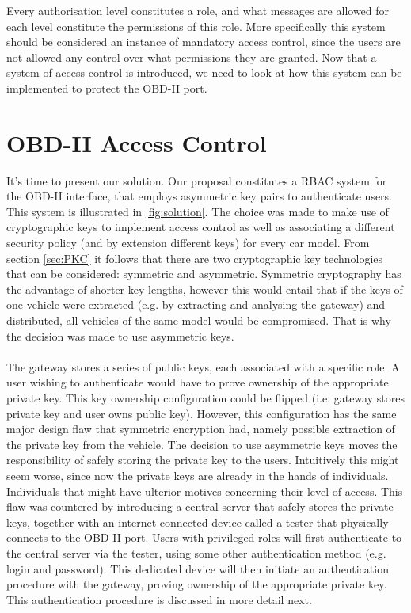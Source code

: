 Every authorisation level constitutes a role, and what messages are allowed for each level constitute the permissions of this role. More specifically this system should be considered an instance of mandatory access control, since the users are not allowed any control over what permissions they are granted. Now that a system of access control is introduced, we need to look at how this system can be implemented to protect the OBD-II port.

\section{OBD-II Access Control}
\label{sec:obd2_access_control}

It's time to present our solution. Our proposal constitutes a RBAC system for the OBD-II interface, that employs asymmetric key pairs to authenticate users. This system is illustrated in \ref{fig:solution}. The choice was made to make use of cryptographic keys to implement access control as well as associating a different security policy (and by extension different keys) for every car model. From section \ref{sec:PKC} it follows that there are two cryptographic key technologies that can be considered: symmetric and asymmetric. Symmetric cryptography has the advantage of shorter key lengths, however this would entail that if the keys of one vehicle were extracted (e.g. by extracting and analysing the gateway) and distributed, all vehicles of the same model would be compromised. That is why the decision was made to use asymmetric keys. \\ \\ The gateway stores a series of public keys, each associated with a specific role. A user wishing to authenticate would have to prove ownership of the appropriate private key. This key ownership configuration could be flipped (i.e. gateway stores private key and user owns public key). However, this configuration has the same major design flaw that symmetric encryption had, namely possible extraction of the private key from the vehicle. The decision to use asymmetric keys moves the responsibility of safely storing the private key to the users. Intuitively this might seem worse, since now the private keys are already in the hands of individuals. Individuals that might have ulterior motives concerning their level of access. This flaw was countered by introducing a central server that safely stores the private keys, together with an internet connected device called a tester that physically connects to the OBD-II port. Users with privileged roles will first authenticate to the central server via the tester, using some other authentication method (e.g. login and password). This dedicated device will then initiate an authentication procedure with the gateway, proving ownership of the appropriate private key. This authentication procedure is discussed in more detail next.

